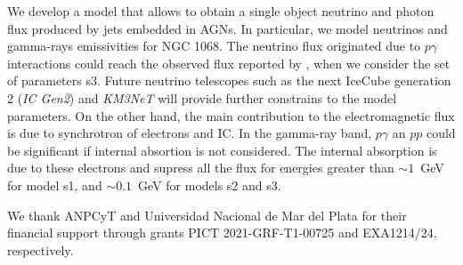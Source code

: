\documentclass[baaa]{baaa}
\begin{document}
We develop a model that allows to obtain a single object neutrino and photon flux produced by jets embedded in AGNs. In particular, we model neutrinos and gamma-rays emissivities for NGC 1068. The neutrino flux originated due to $p\gamma$ interactions could reach the observed flux reported by \cite{Aartsen2020}, when we consider the set of parameters s3. Future neutrino telescopes such as the next IceCube generation 2 ({\sl IC Gen2})  \citep{SantenIceCubeGen22017} and {\sl KM3NeT} \citep{Aiello2019} will provide further constrains to the model parameters.
On the other hand, the main contribution to the electromagnetic flux is due to synchrotron of electrons and IC. In the gamma-ray band, $p\gamma$ an $pp$ could be significant if internal absortion is not considered. The internal absorption is due to these electrons and supress all the flux for energies greater than $\sim 1$~GeV for model s1, and $\sim 0.1$~GeV for models s2 and s3.






















\begin{acknowledgement}
We thank ANPCyT and Universidad Nacional de Mar del Plata for their financial support through grants PICT 2021-GRF-T1-00725 and EXA1214/24, respectively.
\end{acknowledgement}



\small

 
\end{document}
